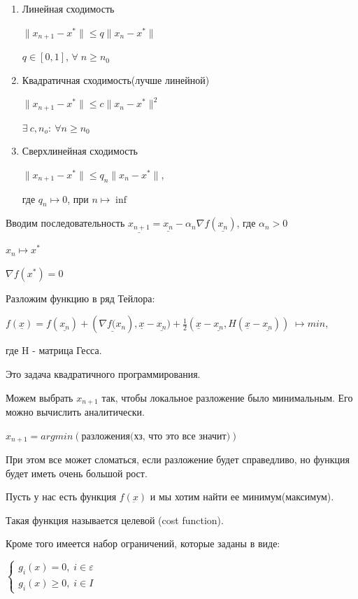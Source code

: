 \documentclass[a4paper, 12pt]{article}
\renewcommand{\epsilon}{\varepsilon}
\begin{document}
	\begin{enumerate}
		\item Линейная сходимость
		
		$\|x_{n+1}-x^*\| \leq q \|x_{n}-x^*\|$
		
		$q \in [0,1]$, $\forall \; n \geq n_0$
		\item Квадратичная сходимость(лучше линейной)
		
		$\|x_{n+1}-x^*\| \leq c \|x_{n}-x^*\|^2$
		
		$\exists \: c, n_o: \: \forall n \geq n_0$
		\item Сверхлинейная сходимость 
		
		$\|x_{n+1}-x^*\| \leq q_n \|x_{n}-x^*\|$,
		
		где $q_n \mapsto 0$, при $n\mapsto \inf$
	\end{enumerate}
	
	Вводим последовательность $\underline{x_{n+1}} = \underline{x_n} - \alpha_n\nabla f(\underline{x_n})$, где $\alpha_n >0$
	
	$x_n \mapsto x^*$
	
	$\nabla f(x^*) = 0$
	
	Разложим функцию в ряд Тейлора:
	
	$f(\underline{x}) = f(\underline{x_n}) + (\underline{\nabla f({x_n}}), \underline{x} - \underline{x_n}) + \frac{1}{2}(\underline{x} - \underline{x_n}, H(\underline{x} - \underline{x_n}))\; \mapsto min$,
	
	где H - матрица Гесса.
	
	Это задача квадратичного программирования.
	
	Можем выбрать $x_{n+1}$ так, чтобы локальное разложение было минимальным. Его можно вычислить аналитически. 
	
	$x_{n+1} = argmin (\textbf{разложения(хз, что это все значит)})$
	
	
	При этом все может сломаться, если разложение будет справедливо, но функция будет иметь очень большой рост.

	Пусть у нас есть функция $f(\underbar{x})$ и мы хотим найти ее минимум(максимум).
	
	Такая функция называется целевой (cost function).
	
	Кроме того имеется набор ограничений, которые заданы в виде:
	
	$\begin{cases}
		g_i(x) = 0, \; i\in \epsilon\\
		g_i(x) \geq 0, \; i\in I
	\end{cases}$
	
\end{document}
